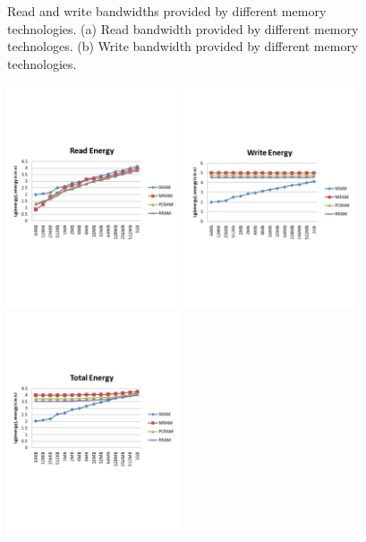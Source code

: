 \documentclass[10pt,letterpaper,singlecolumn]{article}
\begin{document}
\begin{large}
\begin{figure}[htbp]
\vspace*{-1in}
\hspace{0.02in}
\makebox[3in][l]{\textcolor [rgb]{0,0,0} {\bf (a)}}
\makebox[3in][l]{\textcolor [rgb]{0,0,0} {\bf (b)}}

\caption{Read and write bandwidths provided by different memory technologies.
(a) Read bandwidth provided by different memory technologes. (b) Write bandwidth
provided by different memory technologies.}
\label{fig:memory-bw}
\end{figure}

\begin{figure}[htbp]
\centering
\includegraphics[width=2in]{figures/read-energy}
\includegraphics[width=2in]{figures/write-energy}
\includegraphics[width=2in]{figures/total-energy}\\


\end{figure}
\end{large}
\end{document}
